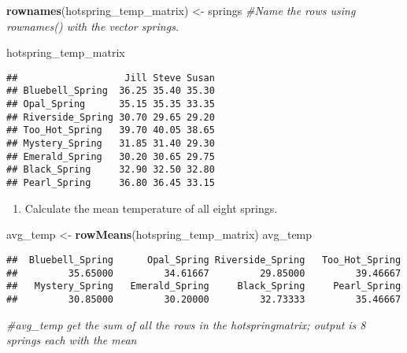 \documentclass[
]{article}
\newenvironment{Shaded}{\begin{snugshade}}{\end{snugshade}}
\newcommand{\CommentTok}[1]{\textcolor[rgb]{0.56,0.35,0.01}{\textit{#1}}}
\newcommand{\FunctionTok}[1]{\textcolor[rgb]{0.13,0.29,0.53}{\textbf{#1}}}
\newcommand{\NormalTok}[1]{#1}
\newcommand{\OtherTok}[1]{\textcolor[rgb]{0.56,0.35,0.01}{#1}}
\providecommand{\tightlist}{%
  \setlength{\itemsep}{0pt}\setlength{\parskip}{0pt}}
\begin{document}
\begin{Shaded}
\begin{Highlighting}[]
\FunctionTok{rownames}\NormalTok{(hotspring\_temp\_matrix) }\OtherTok{\textless{}{-}}\NormalTok{ springs}
\CommentTok{\#Name the rows using \textasciigrave{}rownames()\textasciigrave{} with the vector springs.}
\end{Highlighting}
\end{Shaded}

\begin{Shaded}
\begin{Highlighting}[]
\NormalTok{hotspring\_temp\_matrix}
\end{Highlighting}
\end{Shaded}

\begin{verbatim}
##                   Jill Steve Susan
## Bluebell_Spring  36.25 35.40 35.30
## Opal_Spring      35.15 35.35 33.35
## Riverside_Spring 30.70 29.65 29.20
## Too_Hot_Spring   39.70 40.05 38.65
## Mystery_Spring   31.85 31.40 29.30
## Emerald_Spring   30.20 30.65 29.75
## Black_Spring     32.90 32.50 32.80
## Pearl_Spring     36.80 36.45 33.15
\end{verbatim}

\begin{enumerate}
\def\labelenumi{\arabic{enumi}.}
\setcounter{enumi}{5}
\tightlist
\item
  Calculate the mean temperature of all eight springs.
\end{enumerate}

\begin{Shaded}
\begin{Highlighting}[]
\NormalTok{avg\_temp }\OtherTok{\textless{}{-}} \FunctionTok{rowMeans}\NormalTok{(hotspring\_temp\_matrix)}
\NormalTok{avg\_temp}
\end{Highlighting}
\end{Shaded}

\begin{verbatim}
##  Bluebell_Spring      Opal_Spring Riverside_Spring   Too_Hot_Spring 
##         35.65000         34.61667         29.85000         39.46667 
##   Mystery_Spring   Emerald_Spring     Black_Spring     Pearl_Spring 
##         30.85000         30.20000         32.73333         35.46667
\end{verbatim}

\begin{Shaded}
\begin{Highlighting}[]
\CommentTok{\#avg\_temp get the sum of all the rows in the hotspringmatrix; output is 8 springs each with the mean}
\end{Highlighting}
\end{Shaded}
\end{document}
